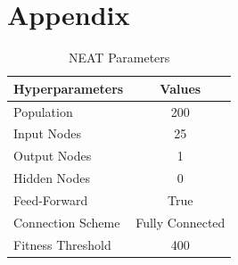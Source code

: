 \documentclass[letterpaper, 12pt]{article}
\begin{document}
\section*{Appendix}

\begin{table}[H]
\centering
\caption{NEAT Parameters}
\label{table:neat}
\begin{NiceTabular}{X|c}
\toprule
\textbf{Hyperparameters} & \textbf{Values} \\
\midrule
Population  & 200 \\
Input Nodes  & 25 \\
Output Nodes  & 1 \\
Hidden Nodes & 0 \\
Feed-Forward & True \\
Connection Scheme & Fully Connected \\
Fitness Threshold & 400 \\
\bottomrule
\end{NiceTabular}
\end{table}
\end{document}
